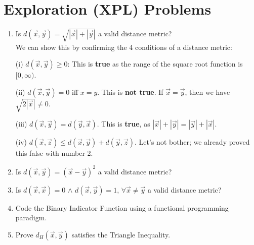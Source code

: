 \section{Exploration (XPL) Problems}

\begin{enumerate}[font=\bfseries]
    \item Is $d(\vec{x},\vec{y}) = \sqrt{|\vec{x}| + |\vec{y}|}$ a valid distance metric? \\

    We can show this by confirming the 4 conditions of a distance metric:
    
    (i) $d(\vec{x},\vec{y}) \ge 0$: This is \textbf{true} as the range of the square root function is $[0,\infty)$.
    
    (ii) $d(\vec{x},\vec{y}) = 0$ iff $x=y$. This is \textbf{not true}. If $\vec{x}=\vec{y}$, then we have $\sqrt{2|\vec{x}|} \neq 0$.
    
    (iii) $d(\vec{x},\vec{y}) = d(\vec{y},\vec{x})$. This is \textbf{true}, as $|\vec{x}| + |\vec{y}| = |\vec{y}| + |\vec{x}|$.
    
    (iv) $d(\vec{x},\vec{z}) \leq d(\vec{x},\vec{y}) + d(\vec{y},\vec{z})$. Let's not bother; we already proved this false with number 2. \\

    \item Is $d(\vec{x},\vec{y}) = (\vec{x} - \vec{y})^2$ a valid distance metric? \\

    \item Is $d(\vec{x},\vec{x}) = 0$ $\wedge$ $d(\vec{x},\vec{y}) = 1$, $\forall \vec{x} \neq \vec{y}$ a valid distance metric? \\

    \item Code the Binary Indicator Function using a functional programming paradigm. \\

    \item Prove $d_H(\vec{x},\vec{y})$ satisfies the Triangle Inequality.
\end{enumerate}
